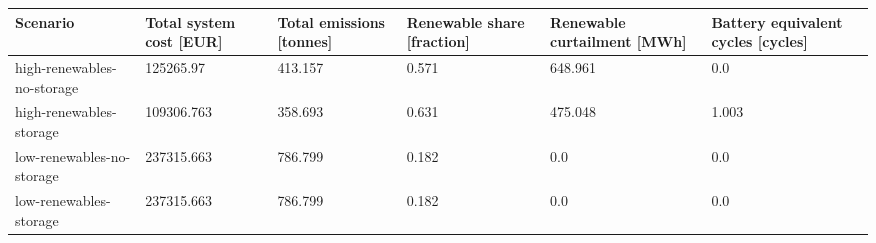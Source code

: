 \begin{tabular}{llllll}
\toprule
Scenario & Total system cost [EUR] & Total emissions [tonnes] & Renewable share [fraction] & Renewable curtailment [MWh] & Battery equivalent cycles [cycles] \\
\midrule
high-renewables-no-storage & 125265.97 & 413.157 & 0.571 & 648.961 & 0.0 \\
high-renewables-storage & 109306.763 & 358.693 & 0.631 & 475.048 & 1.003 \\
low-renewables-no-storage & 237315.663 & 786.799 & 0.182 & 0.0 & 0.0 \\
low-renewables-storage & 237315.663 & 786.799 & 0.182 & 0.0 & 0.0 \\
\bottomrule
\end{tabular}
